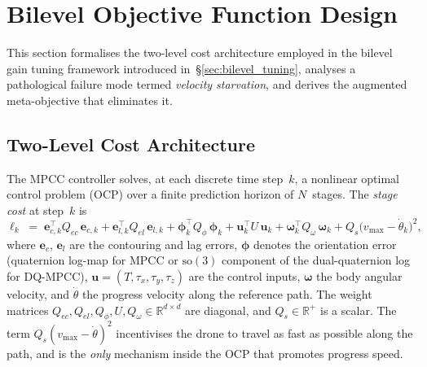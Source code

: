 %


\section{Bilevel Objective Function Design}
\label{sec:bilevel_objective}

This section formalises the two-level cost architecture
employed in the bilevel gain tuning framework introduced
in~\S\ref{sec:bilevel_tuning}, analyses a pathological
failure mode termed \emph{velocity starvation}, and derives
the augmented meta-objective that eliminates it.


\subsection{Two-Level Cost Architecture}
\label{sec:two_level}

The MPCC controller solves, at each discrete time step~$k$,
a nonlinear optimal control problem (OCP) over a finite
prediction horizon of $N$~stages.
The \emph{stage cost} at step~$k$ is
%
\begin{equation}
  \ell_k
  \;=\;
  \mathbf{e}_{c,k}^{\!\top} Q_{ec}\,\mathbf{e}_{c,k}
  + \mathbf{e}_{l,k}^{\!\top} Q_{el}\,\mathbf{e}_{l,k}
  + \boldsymbol{\phi}_{k}^{\!\top} Q_{\phi}\,\boldsymbol{\phi}_{k}
  + \mathbf{u}_{k}^{\!\top} U\,\mathbf{u}_{k}
  + \boldsymbol{\omega}_{k}^{\!\top} Q_{\omega}\,\boldsymbol{\omega}_{k}
  + Q_s\bigl(v_{\max} - \dot\theta_k\bigr)^{2},
  \label{eq:stage_cost}
\end{equation}
%
where $\mathbf{e}_c$, $\mathbf{e}_l$ are the contouring and lag
errors, $\boldsymbol{\phi}$ denotes the orientation error
(quaternion log-map for MPCC or $\mathrm{so}(3)$ component of the
dual-quaternion log for DQ-MPCC), $\mathbf{u}=(T,\tau_x,\tau_y,\tau_z)$
are the control inputs, $\boldsymbol{\omega}$ the body angular
velocity, and $\dot\theta$ the progress velocity along the reference
path.
The weight matrices $Q_{ec},Q_{el},Q_{\phi},U,Q_{\omega} \in
\mathbb{R}^{d\times d}$ are diagonal, and $Q_s \in \mathbb{R}^+$
is a scalar.
The term $Q_s(v_{\max} - \dot\theta)^2$ incentivises the drone to
travel as fast as possible along the path, and is the \emph{only}
mechanism inside the OCP that promotes progress speed.

